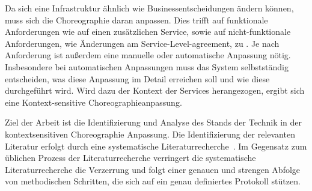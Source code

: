 \documentclass[conference,compsoc]{IEEEtran}
\begin{document}
Da sich eine Infrastruktur ähnlich wie Businessentscheidungen ändern können, muss sich die Choreographie daran anpassen. Dies trifft auf funktionale Anforderungen wie auf einen zusätzlichen Service, sowie auf nicht-funktionale Anforderungen, wie Änderungen am Service-Level-agreement, zu \cite{leite2013systematic}. Je nach Anforderung ist außerdem eine manuelle oder automatische Anpassung nötig. Insbesondere bei automatischen Anpassungen muss das System selbstständig entscheiden, was diese Anpassung im Detail erreichen soll und wie diese durchgeführt wird. Wird dazu der Kontext der Services herangezogen, ergibt sich eine Kontext-sensitive Choreographieanpassung.

Ziel der Arbeit ist die Identifizierung und Analyse des Stands der Technik in der kontextsensitiven Choreographie Anpassung. Die Identifizierung der relevanten Literatur erfolgt durch eine systematische Literaturrecherche~\cite{budgen2006performing,kitchenham2009systematic}. Im Gegensatz zum üblichen Prozess der Literaturrecherche verringert die systematische Literaturrecherche die Verzerrung und folgt einer genauen und strengen Abfolge von methodischen Schritten, die sich auf ein genau definiertes Protokoll stützen.



%
%

\end{document}
